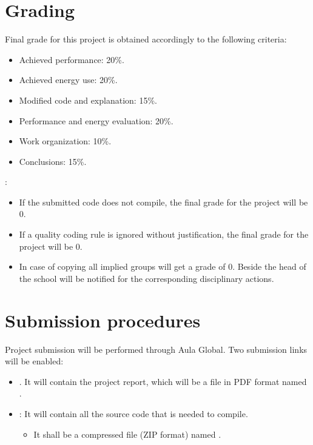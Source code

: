 \section{Grading}

Final grade for this project is obtained accordingly to the following criteria:

\begin{itemize}
  \item Achieved performance: 20\%.
  \item Achieved energy use: 20\%.
  \item Modified code and explanation: 15\%.
  \item Performance and energy evaluation: 20\%.
  \item Work organization: 10\%.
  \item Conclusions: 15\%.
\end{itemize}

:

\begin{itemize}
  \item If the submitted code does not compile, 
        the final grade for the project will be 0.

  \item If a quality coding rule is ignored without justification,
        the final grade for the project will be 0.
        
  \item In case of copying all implied groups will get a grade of 0.
        Beside the head of the school will be notified for
        the corresponding disciplinary actions.
\end{itemize}


\section{Submission procedures}

Project submission will be performed through Aula Global.
Two submission links will be enabled:

\begin{itemize}

\item {}. 
      It will contain the project report,
      which will be a file in PDF format named .

\item {}: 
      It will contain all the source code that is needed to compile.
\begin{itemize}
  \item It shall be a compressed file (ZIP format) named
        .
\end{itemize}

\end{itemize}

